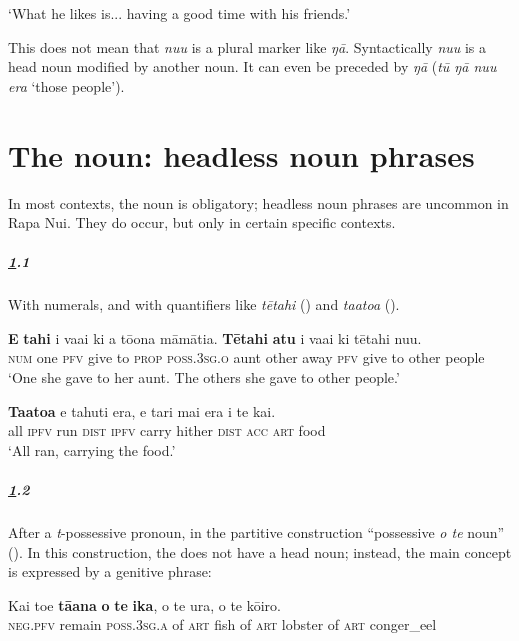 \glt
‘What he likes is... having a good time with his friends.’ \textstyleExampleref{[R489.003]} 
\z

This does not mean that \textit{nu{\ꞌ}u} is a plural marker like \textit{ŋā}. Syntactically \textit{nu{\ꞌ}u} is a head noun modified by another noun. It can even be preceded by \textit{ŋā} (\textit{tū ŋā \mbox{nu{\ꞌ}u} era} ‘those people’).
\section{The noun: headless noun phrases}\label{sec:5.6}
In most contexts, the noun is obligatory; headless noun phrases are uncommon in Rapa Nui. They do occur, but only in certain specific contexts.

\subparagraph{\ref{sec:5.6}.1} With numerals, and with quantifiers like \textit{tētahi} () and \textit{ta{\ꞌ}ato{\ꞌ}a} ().

\ea\label{ex:5.97}
\gll \textbf{E} \textbf{tahi} i va{\ꞌ}ai ki a tō{\ꞌ}ona māmātia. \textbf{Tētahi} \textbf{atu} i va{\ꞌ}ai  ki tētahi nu{\ꞌ}u.\\
\textsc{num} one \textsc{pfv} give to \textsc{prop} \textsc{poss.3sg.o} aunt other away \textsc{pfv} give  to other people\\

\glt 
‘One she gave to her aunt. The others she gave to other people.’ \textstyleExampleref{[R168.006–007]}
\z

\ea\label{ex:5.98}
\gll \textbf{Ta{\ꞌ}ato{\ꞌ}a} e tahuti era, e tari mai era i te kai. \\
all \textsc{ipfv} run \textsc{dist} \textsc{ipfv} carry hither \textsc{dist} \textsc{acc} \textsc{art} food \\

\glt 
‘All ran, carrying the food.’ \textstyleExampleref{[R210.155]} 
\z

\subparagraph{\ref{sec:5.6}.2} After a \textit{t}{}-possessive pronoun, in the partitive construction “possessive \textit{o te} noun” (). In this construction, the  does not have a head noun; instead, the main concept is expressed by a genitive phrase:

\ea\label{ex:5.99}
\gll Kai toe \textbf{tā{\ꞌ}ana} \textbf{o} \textbf{te} \textbf{ika}, o te {\ꞌ}ura, o te kō{\ꞌ}iro. \\
\textsc{neg.pfv} remain \textsc{poss.3sg.a} of \textsc{art} fish of \textsc{art} lobster of \textsc{art} conger\_eel \\

